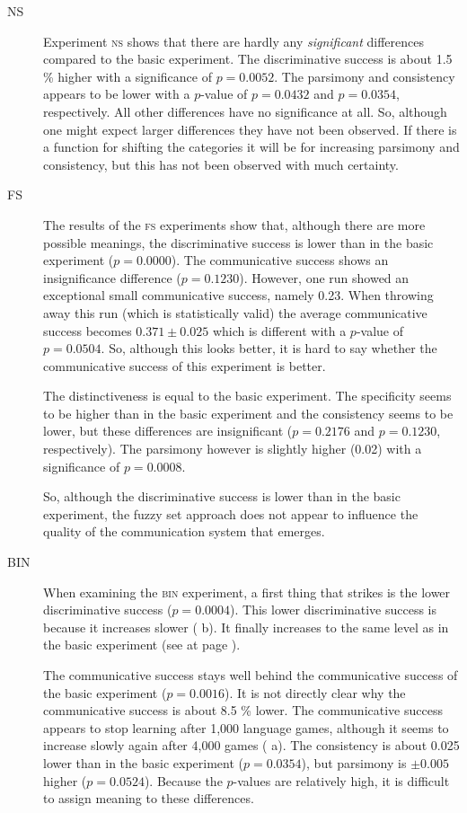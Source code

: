 \begin{description}
\item[NS] Experiment {\scshape ns} shows that there are hardly any {\em significant} differences compared to the basic experiment. The discriminative success is about 1.5 \% higher with a significance of $p=0.0052$. The parsimony and consistency appears to be lower with a $p$-value of $p=0.0432$ and $p=0.0354$, respectively. All other differences have no significance at all. So, although one might expect larger differences they have not been observed. If there is a function for shifting the categories it will be for increasing parsimony and consistency, but this has not been observed with much certainty.

\item[FS] The results of the {\scshape fs} experiments show that, although there are more possible meanings, the discriminative success is lower than in the basic experiment ($p=0.0000$). The communicative success shows an insignificance difference ($p=0.1230$). However, one run showed an exceptional small communicative success, namely 0.23. When throwing away this run (which is statistically valid) the average communicative success becomes $0.371 \pm 0.025$ which is different with a $p$-value of $p=0.0504$. So, although this looks better, it is hard to say whether the communicative success of this experiment is better. 

The distinctiveness is equal to the basic experiment. The specificity seems to be higher than in the basic experiment and the consistency seems to be lower, but these differences are insignificant ($p=0.2176$ and $p=0.1230$, respectively). The parsimony however is slightly higher (0.02) with a significance of $p=0.0008$.

So, although the discriminative success is lower than in the basic experiment, the fuzzy set approach does not appear to influence the quality of the communication system that emerges. 

\item[BIN] When examining the {\scshape bin} experiment, a first thing that strikes is the lower discriminative success ($p=0.0004$). This lower discriminative success is because it increases slower ( b). It finally increases to the same level as in the basic experiment (see  at page \pageref{f:st:plot}).

\enlargethispage{1\baselineskip}
The communicative success stays well behind the communicative success of the basic experiment ($p=0.0016$). It is not directly clear why the communicative success is about 8.5 \% lower. The communicative success appears to stop learning after 1,000 language games, although it seems to increase slowly again after 4,000 games ( a). The consistency is about 0.025 lower than in the basic experiment ($p=0.0354$), but parsimony is $\pm 0.005$ higher ($p=0.0524$). Because the $p$-values are relatively high, it is difficult to assign meaning to these differences.


\end{description}
